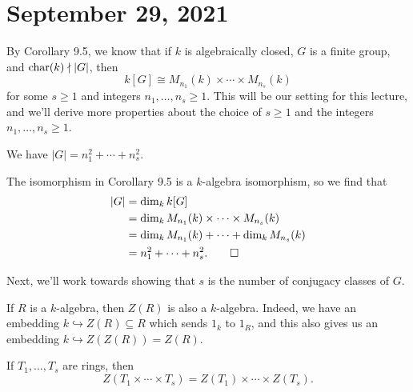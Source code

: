 \section{September 29, 2021}
By Corollary 9.5, we know that if $k$ is algebraically closed, $G$ 
is a finite group, and $\operatorname{char}(k) \nmid |G|$, then 
\[ k[G] \cong M_{n_1}(k) \times \cdots \times M_{n_s}(k) \] 
for some $s \geq 1$ and integers $n_1, \dots, n_s \geq 1$. 
This will be our setting for this lecture, and
we'll derive more properties about the choice of $s \geq 1$ and the integers 
$n_1, \dots, n_s \geq 1$. 

\begin{theo}{}
    We have $|G| = n_1^2 + \cdots + n_s^2$. 
\end{theo}
\begin{pf}
    The isomorphism in Corollary 9.5 is a $k$-algebra isomorphism, so we 
    find that 
    \begin{align*}
        |G| &= \dim_k k[G] \\
        &= \dim_k M_{n_1}(k) \times \cdots \times M_{n_s}(k) \\
        &= \dim_k M_{n_1}(k) + \cdots + \dim_k M_{n_s}(k) \\
        &= n_1^2 + \cdots + n_s^2. \qedhere 
    \end{align*}
\end{pf}

Next, we'll work towards showing that $s$ is the number of conjugacy classes of $G$.

\begin{remark}{}
    If $R$ is a $k$-algebra, then $Z(R)$ is also a $k$-algebra. Indeed, we have
    an embedding $k \hookrightarrow Z(R) \subseteq R$ which sends $1_k$ 
    to $1_R$, and this also gives us an embedding $k \hookrightarrow 
    Z(Z(R)) = Z(R)$. 
\end{remark}

\begin{remark}{}
    If $T_1, \dots, T_s$ are rings, then 
    \[ Z(T_1 \times \cdots \times T_s) = Z(T_1) \times \cdots \times Z(T_s). \]
\end{remark}

